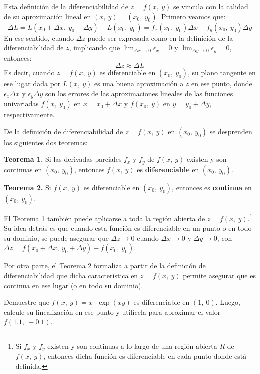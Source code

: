 \documentclass[12pt]{article}
\begin{document}
Esta definición de la diferenciabilidad de $z = f(x, \ y)$ se vincula con la calidad de su aproximación lineal en $(x, \ y) = (x_{0}, \ y_{0})$. Primero veamos que:
\[
  \Delta L = L(x_{0} + \Delta x, \ y_{0} + \Delta y) - L(x_{0}, \ y_{0})= f_{x}(x_{0}, \ y_{0}) \Delta x + f_{y}(x_{0}, \ y_{0}) \Delta y
\]
En ese sentido, cuando $\Delta z$ puede ser expresada como en la definición de la diferenciabilidad de $z$, implicando que $\lim_{\Delta x \to 0} \epsilon_{x} = 0$ y $\lim_{\Delta y \to 0} \epsilon_{y} = 0$, entonces:
\[
  \Delta z \approx \Delta L
\]
Es decir, cuando $z = f(x, \ y)$ es diferenciable en $(x_{0}, \ y_{0})$, su plano tangente en ese lugar dada por $L(x, \ y)$ es una buena aproximación a $z$ en ese punto, donde $\epsilon_{x} \Delta x$ y $\epsilon_{y} \Delta y$ son los errores de las aproximaciones lineales de las funciones univariadas $f(x, \ y_{0})$ en $x = x_{0} + \Delta x$ y $f(x_{0}, \ y)$ en $y = y_{0} + \Delta y$, respectivamente.

De la definición de diferenciabilidad de $z = f(x, \ y)$ en $(x_{0}, \ y_{0})$ se desprenden los siguientes dos teoremas:

\textbf{Teorema 1.} Si las derivadas parciales $f_{x}$ y $f_{y}$ de $f(x, \ y)$ existen y son continuas en $(x_{0}, \ y_{0})$, entonces $f(x, \ y)$ es \textbf{diferenciable} en $(x_{0}, \ y_{0})$.

\textbf{Teorema 2.} Si $f(x, \ y)$ es diferenciable en $(x_{0}, \ y_{0})$, entonces es \textbf{continua} en $(x_{0}, \ y_{0})$.

El Teorema 1 también puede aplicarse a toda la región abierta de $z = f(x, \ y)$.\footnote{Si $f_{x}$ y $f_{y}$ existen y son continuas a lo largo de una región abierta $R$ de $f(x, \ y)$, entonces dicha función es diferenciable en cada punto donde está definida.} Su idea detrás es que cuando esta función es diferenciable en un punto o en todo su dominio, se puede asegurar que $\Delta z \to 0$ cuando $\Delta x \to 0$ y $\Delta y \to 0$, con $\Delta z = f(x_{0} + \Delta x, \ y_{0} + \Delta y) - f(x_{0}, \ y_{0})$.

Por otra parte, el Teorema 2 formaliza a partir de la definición de diferenciabilidad que dicha característica en $z = f(x, \ y)$ permite asegurar que es continua en ese lugar (o en todo su dominio).

\ejemplo Demuestre que $f(x, \ y) = x \cdot \exp(xy)$ es diferenciable en $(1, \ 0)$. Luego, calcule su linealización en ese punto y utilícela para aproximar el valor $f(1.1, \ -0.1)$.
\end{document}
